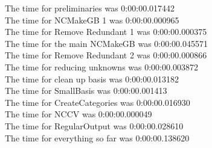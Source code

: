 \documentclass[rep10,leqno]{report}
\begin{document}
\noindent
The time for preliminaries was 0:00:00.017442\\
The time for NCMakeGB 1 was 0:00:00.000965\\
The time for Remove Redundant 1 was 0:00:00.000375\\
The time for the main NCMakeGB was 0:00:00.045571\\
The time for Remove Redundant 2 was 0:00:00.000866\\
The time for reducing unknowns was 0:00:00.003872\\
The time for clean up basis was 0:00:00.013182\\
The time for SmallBasis was 0:00:00.001413\\
The time for CreateCategories was 0:00:00.016930\\
The time for NCCV was 0:00:00.000049\\
The time for RegularOutput was 0:00:00.028610\\
The time for everything so far was 0:00:00.138620\\
\end{document}
